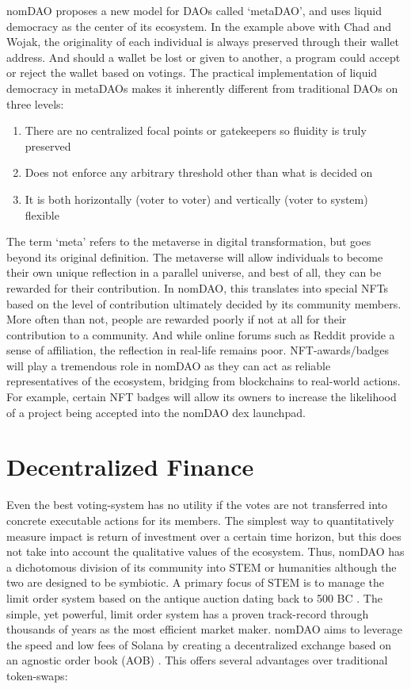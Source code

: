 \documentclass[12pt]{article}
\begin{document}
nomDAO proposes a new model for DAOs called ‘metaDAO’, and uses liquid democracy as the center of its ecosystem. In the example above with Chad and Wojak, the originality of each individual is always preserved through their wallet address. And should a wallet be lost or given to another, a program could accept or reject the wallet based on votings. The practical implementation of liquid democracy in metaDAOs makes it inherently different from traditional DAOs on three levels:

\begin{enumerate}

\item There are no centralized focal points or gatekeepers so fluidity is truly preserved

\item Does not enforce any arbitrary threshold other than what is decided on

\item It is both horizontally (voter to voter) and vertically (voter to system) flexible

\end{enumerate}

The term ‘meta’ refers to the metaverse \cite{metaverse} in digital transformation, but goes beyond its original definition. The metaverse will allow individuals to become their own unique reflection in a parallel universe, and best of all, they can be rewarded for their contribution. In nomDAO, this translates into special NFTs based on the level of contribution ultimately decided by its community members. More often than not, people are rewarded poorly if not at all for their contribution to a community. And while online forums such as Reddit \cite{reddit} provide a sense of affiliation, the reflection in real-life remains poor. NFT-awards/badges will play a tremendous role in nomDAO as they can act as reliable representatives of the ecosystem, bridging from blockchains to real-world actions. For example, certain NFT badges will allow its owners to increase the likelihood of a project being accepted into the nomDAO dex launchpad.

\section*{Decentralized Finance}

Even the best voting-system has no utility if the votes are not transferred into concrete executable actions for its members. The simplest way to quantitatively measure impact is return of investment over a certain time horizon, but this does not take into account the qualitative values of the ecosystem. Thus, nomDAO has a dichotomous division of its community into STEM or humanities although the two are designed to be symbiotic. A primary focus of STEM is to manage the limit order system based on the antique auction dating back to 500 BC \cite{auction}. The simple, yet powerful, limit order system has a proven track-record through thousands of years as the most efficient market maker. nomDAO aims to leverage the speed and low fees of Solana by creating a decentralized exchange based on an agnostic order book (AOB) \cite{aob}. This offers several advantages over traditional token-swaps:
\end{document}
